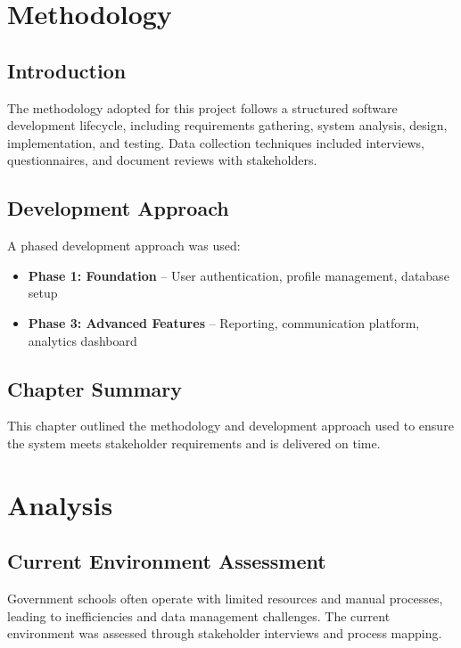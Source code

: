 \documentclass[12pt,a4paper]{report}
\begin{document}
\chapter{Methodology}
\section{Introduction}
The methodology adopted for this project follows a structured software development lifecycle, including requirements gathering, system analysis, design, implementation, and testing. Data collection techniques included interviews, questionnaires, and document reviews with stakeholders.

\section{Development Approach}
A phased development approach was used:
\begin{itemize}
    \item \textbf{Phase 1: Foundation} -- User authentication, profile management, database setup
    \item \textbf{Phase 3: Advanced Features} -- Reporting, communication platform, analytics dashboard
\end{itemize}

\section{Chapter Summary}
This chapter outlined the methodology and development approach used to ensure the system meets stakeholder requirements and is delivered on time.

\chapter{Analysis}
\section{Current Environment Assessment}
Government schools often operate with limited resources and manual processes, leading to inefficiencies and data management challenges. The current environment was assessed through stakeholder interviews and process mapping.
\end{document}

